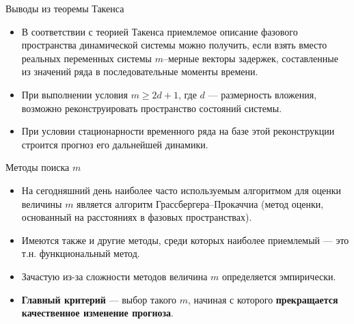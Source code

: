 \begin{frame}{Выводы из теоремы Такенса}
\begin{itemize}
    \item  В соответствии с теорией Такенса приемлемое описание фазового пространства динамической
системы можно получить, если взять вместо реальных переменных системы  $m$–мерные векторы задержек, составленные из значений ряда в последовательные моменты времени.
    \item При выполнении условия $m \geq 2d + 1$, где $d$ — размерность вложения, возможно реконструировать пространство состояний системы.
    \item При условии стационарности временного ряда на базе этой реконструкции строится прогноз его дальнейшей динамики.
\end{itemize}
\end{frame}
\begin{frame}{Методы поиска $m$}
\begin{itemize}
    \item На сегодняшний день наиболее часто используемым алгоритмом для оценки величины $m$ является алгоритм Грассбергера–Прокаччиа (метод оценки, основанный на расстояниях в фазовых пространствах).
    \item Имеются также и другие методы, среди которых наиболее приемлемый — это т.н. функциональный метод.
    \item Зачастую из-за сложности методов величина $m$ определяется эмпирически.
    \item \textbf{Главный критерий} --- выбор такого $m$, начиная с которого \textbf{прекращается качественное изменение прогноза}.
\end{itemize}

\end{frame}
